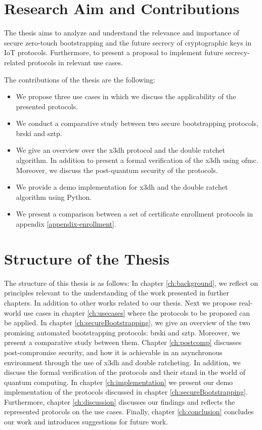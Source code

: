 \section{Research Aim and Contributions}\label{sec:reserach_questions}
The thesis aims to analyze and understand the relevance and importance of secure zero-touch bootstrapping and the future secrecy of cryptographic keys in IoT protocols. Furthermore, to present a proposal to implement future secrecy-related protocols in relevant use cases.
\par
The contributions of the thesis are the following:
\begin{itemize}
	\item We propose three use cases in which we discuss the applicability of the presented protocols.
	\item We conduct a comparative study between two secure bootstrapping protocols, \gls{brski} and \gls{sztp}.
	\item We give an overview over the \gls{x3dh} protocol and the double ratchet algorithm. In addition to present a formal verification of the \gls{x3dh} using \gls{ofmc}. Moreover, we discuss the post-quantum security of the protocols.
	\item We provide a demo implementation for \gls{x3dh} and the double ratchet algorithm using Python.
	\item We present a comparison between a set of certificate enrollment protocols in appendix \ref{appendix-enrollment}.
\end{itemize}

\section{Structure of the Thesis}\label{sec:structure_of_the_thesis}

The structure of this thesis is as follows: In chapter \ref{ch:background}, we reflect on principles relevant to the understanding of the work presented in further chapters. In addition to other works related to our thesis. 
Next we propose real-world use cases in chapter \ref{ch:usecases} where the protocols to be proposed can be applied.
In chapter \ref{ch:secureBootstrapping}, we give an overview of the two promising automated bootstrapping protocols: \gls{brski} and \gls{sztp}. Moreover, we present a comparative study between them.
Chapter \ref{ch:postcomp} discusses post-compromise security, and how it is achievable in an asynchronous environment through the use of \gls{x3dh} and double ratcheting. In addition, we discuss the formal verification of the protocols and their stand in the world of quantum computing.
In chapter \ref{ch:implementation} we present our demo implementation of the protocols discussed in chapter \ref{ch:secureBootstrapping}. 
Furthermore, chapter \ref{ch:discussion} discusses our findings and reflects the represented protocols on the use cases.
Finally, chapter \ref{ch:conclusion} concludes our work and introduces suggestions for future work.